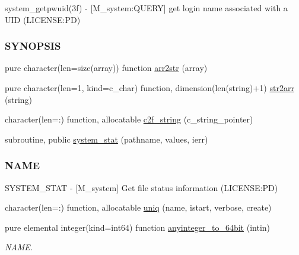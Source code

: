 \begin{DoxyCompactItemize}
\begin{DoxyCompactList}
system\+\_\+getpwuid(3f) -\/ \mbox{[}M\+\_\+system\+:Q\+U\+E\+RY\mbox{]} get login name associated with a U\+ID (L\+I\+C\+E\+N\+SE\+:PD) \subsubsection*{S\+Y\+N\+O\+P\+S\+IS}\end{DoxyCompactList}\item 
pure character(len=size(array)) function \mbox{\hyperlink{namespacem__system_aeb3d7d4cb39d59917910a3ae2532206d}{arr2str}} (array)
\item 
pure character(len=1, kind=c\+\_\+char) function, dimension(len(string)+1) \mbox{\hyperlink{namespacem__system_af7e778ffc24aa7bc00b842a8e673aeaa}{str2arr}} (string)
\item 
character(len=\+:) function, allocatable \mbox{\hyperlink{namespacem__system_aa7c5445619aa15cd2301fe17f7c3b73c}{c2f\+\_\+string}} (c\+\_\+string\+\_\+pointer)
\item 
subroutine, public \mbox{\hyperlink{namespacem__system_a5bb1ebcebe181e07fd24e908cacc9887}{system\+\_\+stat}} (pathname, values, ierr)
\begin{DoxyCompactList}\small\item\em \subsubsection*{N\+A\+ME}

S\+Y\+S\+T\+E\+M\+\_\+\+S\+T\+AT -\/ \mbox{[}M\+\_\+system\mbox{]} Get file status information (L\+I\+C\+E\+N\+SE\+:PD) \end{DoxyCompactList}\item 
character(len=\+:) function, allocatable \mbox{\hyperlink{namespacem__system_a403bef1f7fdc42dd75a5b082a15237ff}{uniq}} (name, istart, verbose, create)
\item 
pure elemental integer(kind=int64) function \mbox{\hyperlink{namespacem__system_a151da54be39dddcf270cceeff3243438}{anyinteger\+\_\+to\+\_\+64bit}} (intin)
\begin{DoxyCompactList}\small\item\em N\+A\+ME. \end{DoxyCompactList}\end{DoxyCompactItemize}
